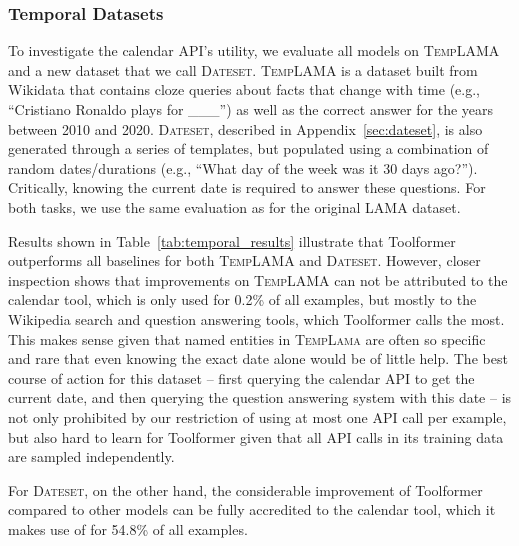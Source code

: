 \documentclass[11pt]{article}
\newcommand{\ours}[0]{Toolformer}
\begin{document}
\begin{CJK*}{UTF8}{gbsn}
\subsubsection{Temporal Datasets}

To investigate the calendar API's utility, we  evaluate all models on \textsc{TempLAMA} \citep{dhingra-etal-2022-time} and a new dataset that we call \textsc{Dateset}. \textsc{TempLAMA} is a dataset built from Wikidata that contains cloze queries about facts that change with time (e.g., ``Cristiano Ronaldo plays for \_\_\_'') as well as the correct answer for the years between 2010 and 2020. \textsc{Dateset}, described in Appendix~\ref{sec:dateset}, is also generated through a series of templates, but populated using a combination of random dates/durations (e.g., ``What day of the week was it 30 days ago?''). Critically, knowing the current date is required to answer these questions. For both tasks, we use the same evaluation as for the original LAMA dataset.

Results shown in Table~\ref{tab:temporal_results} illustrate that \ours{} outperforms all baselines for both \textsc{TempLAMA} and \textsc{Dateset}. However, closer inspection shows that improvements on \textsc{TempLAMA} can not be attributed to the calendar tool, which is only used for 0.2\% of all examples, but mostly to the Wikipedia search and question answering tools, which \ours{} calls the most. This makes sense given that
named entities in \textsc{TempLama} are often so specific and rare that even knowing the exact date alone would be of little help. The best course of action for this dataset -- first querying the calendar API to get the current date, and then querying the question answering system with this date -- is not only prohibited by our restriction of using at most one API call per example, but also hard to learn for \ours{} given that all API calls in its training data are sampled independently.

For \textsc{Dateset}, on the other hand, the considerable improvement of \ours{} compared to other models can be fully accredited to the calendar tool, which it makes use of for 54.8\% of all examples.


\end{CJK*}
\end{document}
